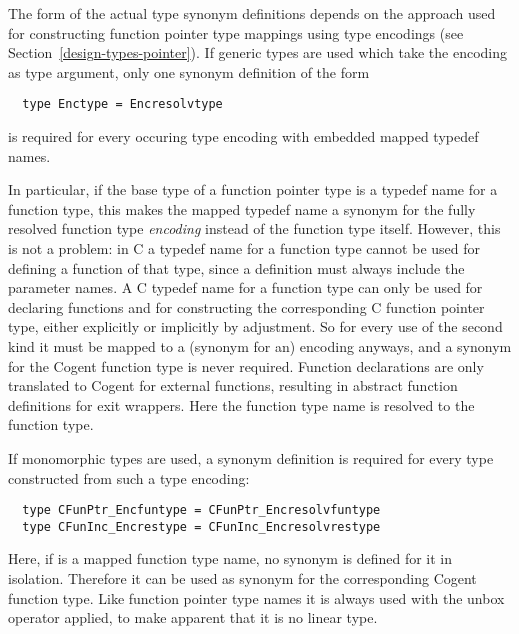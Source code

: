 The form of the actual type synonym definitions depends on the approach used for constructing function pointer type 
mappings using type encodings (see Section~\ref{design-types-pointer}). If generic types are used which take the encoding
as type argument, only one synonym definition of the form 
\begin{verbatim}
  type Enctype = Encresolvtype
\end{verbatim}
is required for every occuring type encoding  with embedded mapped typedef names. 

In particular, if the base type of a function pointer type is a typedef name for a function type, this makes the mapped
typedef name  a synonym for the fully resolved function type \textit{encoding} instead of the function type itself.
However, this is not a problem: in C a typedef name for a function type cannot be used for defining a function of that type, 
since a definition must always include the parameter names. A C typedef name for a function type can only be used
for declaring functions and for constructing the corresponding C function pointer type, either explicitly or implicitly 
by adjustment. So for every use of the second kind it must be mapped to a (synonym for an) encoding anyways, and a synonym 
for the Cogent function type is never required. Function declarations are only translated to Cogent for external functions,
resulting in abstract function definitions for exit wrappers. Here the function type name is resolved to the function type.

If monomorphic types are
used, a synonym definition is required for every type constructed from such a type encoding:
\begin{verbatim}
  type CFunPtr_Encfuntype = CFunPtr_Encresolvfuntype
  type CFunInc_Encrestype = CFunInc_Encresolvrestype
\end{verbatim}
Here, if  is a mapped function type name, no synonym is defined for it in isolation. Therefore it can 
be used as synonym for the corresponding Cogent function type. Like function pointer type names it is always used with
the unbox operator applied, to make apparent that it is no linear type.

